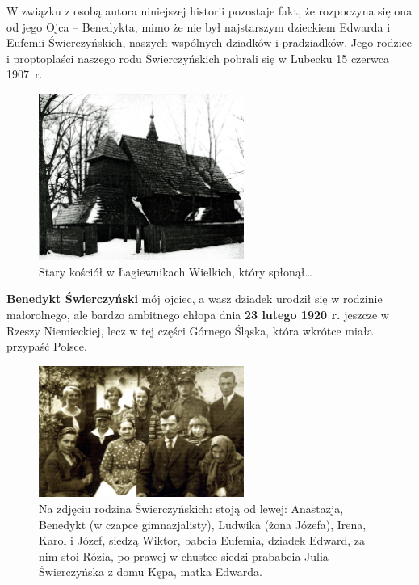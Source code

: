 W związku  z osobą autora niniejszej historii pozostaje fakt, że rozpoczyna się ona od  jego Ojca -- Benedykta, mimo że nie był najstarszym dzieckiem Edwarda i Eufemii Świerczyńskich, naszych wspólnych dziadków i pradziadków. Jego rodzice i proptoplaści naszego rodu Świerczyńskich pobrali się w Lubecku 15 czerwca 1907~r.

\begin{figure}[!h]
\begin{center}
\includegraphics[width=0.6\textwidth]{photo/lagiewniki_wielkie.jpg}
\caption{Stary kościół w Łagiewnikach Wielkich, który spłonął\ldots}
\label{rys:lagiewniki_wielkie}
\end{center}
\end{figure}

\textbf{Benedykt Świerczyński} mój ojciec, a wasz dziadek urodził się w rodzinie małorolnego, ale bardzo ambitnego chłopa dnia \textbf{23 lutego 1920 r.} jeszcze w Rzeszy Niemieckiej, lecz w tej części Górnego Śląska, która wkrótce miała przypaść Polsce.

\begin{figure}[!h]
\begin{center}
\includegraphics[width=0.6\textwidth]{photo/rodzina_swierczynskich_1.jpg}
\caption[Rodzina Świerczyńskich]{Na zdjęciu rodzina Świerczyńskich: stoją od lewej: Anastazja, Benedykt (w czapce gimnazjalisty), Ludwika (żona Józefa), Irena, Karol i Józef, siedzą Wiktor, babcia Eufemia, dziadek Edward, za nim stoi Rózia, po prawej w chustce siedzi prababcia Julia Świerczyńska z domu Kępa, matka Edwarda.}
\label{rys:rodzina_swierczynskich_1}
\end{center}
\end{figure}

